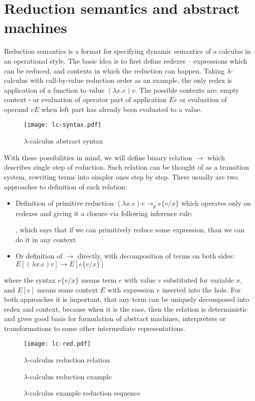 \documentclass[inz, english, shortabstract]{iithesis}
\newcommand{\LC}{\(\lambda\)-calculus}
\begin{document}
\section{Reduction semantics and abstract machines}
Reduction semantics is a format for specifying dynamic semantics of a calculus in an operational style.
The basic idea is to first define redexes -- expressions which can be reduced, and contexts in which the reduction can happen.
Taking \LC{} with call-by-value reduction order as an example, the only redex is application of a function to value $ (\lambda x . e) v $.
The possible contexts are: empty context $ \square $ or evaluation of operator part of application $ E e $ or evaluation of operand $ v E $ when left part has already been evaluated to a value.
\begin{figure}
  \texttt{[image: lc-syntax.pdf]}
  \caption{\LC{} abstract syntax}
  \label{fig:lc-syntax}
\end{figure}
With these possibilities in mind, we will define binary relation $ \longrightarrow $ which describes single step of reduction.
Such relation can be thought of as a transition system, rewriting terms into simpler ones step by step.
There usually are two approaches to definition of such relation:
\begin{itemize}
  \item Definition of primitive reduction $ (\lambda x . e) v \longrightarrow_p e\{v/x\} $ which operates only on redexes and giving it a closure via following inference rule:
  \begin{prooftree}
  \end{prooftree},
  which says that if we can primitively reduce some expression, than we can do it in any context.
  \item Or definition of $ \longrightarrow $ directly, with decomposition of terms on both sides: $ E[(\lambda x . e) v] \longrightarrow E[e\{v/x\}] $
\end{itemize}
where the syntax $ e\{v/x\} $ means term $ e $ with value $ v $ substituted for variable $ x $, and $ E[e] $ means some context $ E $ with expression $ e $ inserted into the hole.
For both approaches it is important, that any term can be uniquely decomposed into redex and context, because when it is the case, then the relation is deterministic and gives good basis for formulation of abstract machines, interpreters or transformations to some other intermediate representations.
\begin{figure}
  \texttt{[image: lc-red.pdf]} 
  \caption{\LC{} reduction relation}
  \label{fig:lc-red}
\end{figure}
\begin{figure}
  \LC{} reduction example
  \caption{\LC{} example reduction sequence}
  \label{fig:lc-red-example}
\end{figure}
\end{document}
